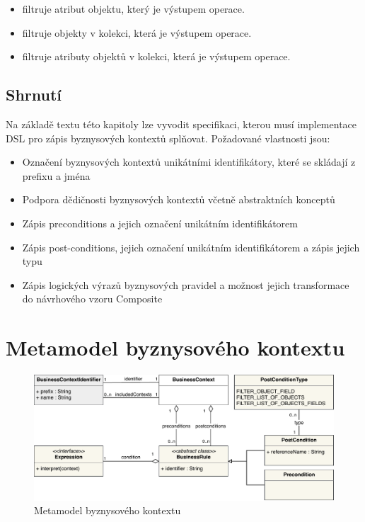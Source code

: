 \begin{itemize}
    \item {} filtruje atribut objektu, který je výstupem operace.
    \item {} filtruje objekty v kolekci, která je výstupem operace.
    \item {} filtruje atributy objektů v kolekci, která je výstupem operace.
\end{itemize}

\subsection{Shrnutí}

Na základě textu této kapitoly lze vyvodit specifikaci, kterou musí implementace \gls{DSL} pro zápis
byznysových kontextů splňovat. Požadované vlastnosti jsou:

\begin{itemize}
    \item Označení byznysových kontextů unikátními identifikátory, které se skládají z prefixu a jména
    \item Podpora dědičnosti byznysových kontextů včetně abstraktních konceptů
    \item Zápis preconditions a jejich označení unikátním identifikátorem
    \item Zápis post-conditions, jejich označení unikátním identifikátorem a zápis jejich typu
    \item Zápis logických výrazů byznysových pravidel a možnost jejich transformace do návrhového vzoru Composite
\end{itemize}

\section{Metamodel byznysového kontextu}\label{sec:metamodel}

\begin{figure}
    \centering
    \includegraphics[keepaspectratio=true, width=\linewidth]{figures/business-context-metamodel.pdf}
    \caption{Metamodel byznysového kontextu}
    \label{fig:business-context-metamodel}
\end{figure}

